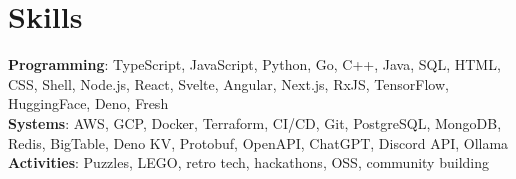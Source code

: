 \documentclass[letterpaper,11pt]{article}
\newcommand{\resumeItem}[1]{
  \item\small{
    {#1 \vspace{-2pt}}
  }
}
\begin{document}
\section{Skills}
\begin{itemize}[leftmargin=0.15in, label={}]
    \resumeItem{\item{
      \textbf{Programming}{: TypeScript, JavaScript, Python, Go, C++, Java, SQL, HTML, CSS, Shell, Node.js, React, Svelte, Angular, Next.js, RxJS, TensorFlow, HuggingFace, Deno, Fresh} \\
      \textbf{Systems}{: AWS, GCP, Docker, Terraform, CI/CD, Git, PostgreSQL, MongoDB, Redis, BigTable, Deno KV, Protobuf, OpenAPI, ChatGPT, Discord API, Ollama} \\
      \textbf{Activities}{: Puzzles, LEGO, retro tech, hackathons, OSS, community building}
    }}
 \end{itemize}

\end{document}
